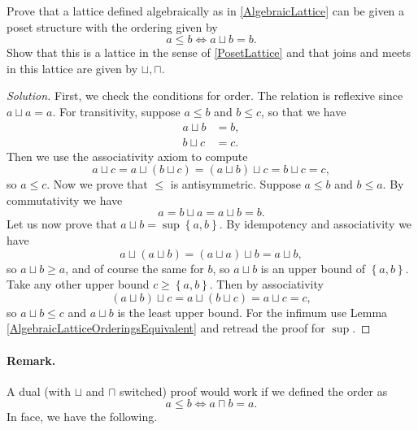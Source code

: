 \begin{problem}
    Prove that a lattice defined algebraically as in \ref{AlgebraicLattice} can be given a poset structure with the ordering given by
    \[ 
       a \leqslant b \Leftrightarrow a \sqcup b = b. 
   \]
   Show that this is a lattice in the sense of \ref{PosetLattice} and that joins and meets in this lattice are given by \( \sqcup, \sqcap \).
\end{problem}

\begin{proof}[Solution]
    First, we check the conditions for order. The relation is reflexive since \( a \sqcup a = a \). For transitivity, suppose \( a \leqslant b \) and \( b \leqslant c \), so that we have
    \begin{align*}
        a \sqcup b &= b, \\
        b \sqcup c &= c.
    \end{align*}
    Then we use the associativity axiom to compute
    \[ 
    a \sqcup c = a \sqcup (b \sqcup c) = (a \sqcup b) \sqcup c = b \sqcup c = c,
    \]
    so \( a \leqslant c \). Now we prove that \( \leqslant \) is antisymmetric. Suppose \( a \leqslant b \) and \( b \leqslant a \). By commutativity we have
    \[ 
        a = b \sqcup a = a \sqcup b = b.
    \]
    Let us now prove that \( a \sqcup b = \sup \left\{ a, b \right\} \). By idempotency and associativity we have
    \[ 
       a \sqcup (a \sqcup b) = (a \sqcup a) \sqcup b = a \sqcup b, 
   \]
   so \( a \sqcup b \geqslant a \), and of course the same for \( b \), so \( a \sqcup b \) is an upper bound of \( \left\{ a, b \right\} \). Take any other upper bound \( c \geqslant \left\{ a, b \right\} \). Then by associativity
   \[ 
   (a \sqcup b) \sqcup c = a \sqcup (b \sqcup c) = a \sqcup c = c, 
  \]
  so \( a \sqcup b \leqslant c \) and \( a \sqcup b \) is the least upper bound. For the infimum use Lemma \ref{AlgebraicLatticeOrderingsEquivalent} and retread the proof for \( \sup \). 
\end{proof}

\paragraph{Remark.} A dual (with \( \sqcup \) and \( \sqcap \) switched) proof would work if we defined the order as
\[ 
    a \leqslant b \Leftrightarrow a \sqcap b = a. 
\]
In face, we have the following.


